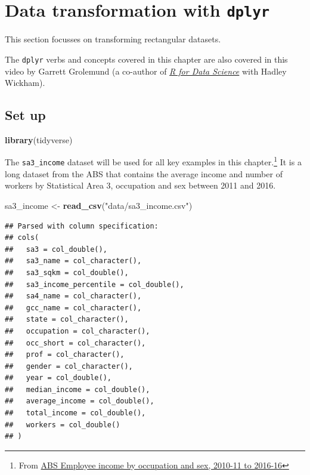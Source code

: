 \documentclass[]{book}
\newenvironment{Shaded}{\begin{snugshade}}{\end{snugshade}}
\newcommand{\KeywordTok}[1]{\textcolor[rgb]{0.13,0.29,0.53}{\textbf{#1}}}
\newcommand{\NormalTok}[1]{#1}
\newcommand{\StringTok}[1]{\textcolor[rgb]{0.31,0.60,0.02}{#1}}
\begin{document}
\hypertarget{data-transformation-with-dplyr}{%
\chapter{\texorpdfstring{Data transformation with \texttt{dplyr}}{Data transformation with dplyr}}\label{data-transformation-with-dplyr}}

This section focusses on transforming rectangular datasets.

The \texttt{dplyr} verbs and concepts covered in this chapter are also covered in this video by Garrett Grolemund (a co-author of \emph{\href{https://r4ds.had.co.nz/}{R for Data Science}} with Hadley Wickham).

\hypertarget{set-up}{%
\section{Set up}\label{set-up}}

\begin{Shaded}
\begin{Highlighting}[]
\KeywordTok{library}\NormalTok{(tidyverse)}
\end{Highlighting}
\end{Shaded}

The \texttt{sa3\_income} dataset will be used for all key examples in this chapter.\footnote{From \href{https://www.abs.gov.au/AUSSTATS/abs@.nsf/DetailsPage/6524.0.55.0022011-2016?OpenDocument}{ABS Employee income by occupation and sex, 2010-11 to 2016-16}} It is a long dataset from the ABS that contains the average income and number of workers by Statistical Area 3, occupation and sex between 2011 and 2016.

\begin{Shaded}
\begin{Highlighting}[]
\NormalTok{sa3_income <-}\StringTok{ }\KeywordTok{read_csv}\NormalTok{(}\StringTok{"data/sa3_income.csv"}\NormalTok{)}
\end{Highlighting}
\end{Shaded}

\begin{verbatim}
## Parsed with column specification:
## cols(
##   sa3 = col_double(),
##   sa3_name = col_character(),
##   sa3_sqkm = col_double(),
##   sa3_income_percentile = col_double(),
##   sa4_name = col_character(),
##   gcc_name = col_character(),
##   state = col_character(),
##   occupation = col_character(),
##   occ_short = col_character(),
##   prof = col_character(),
##   gender = col_character(),
##   year = col_double(),
##   median_income = col_double(),
##   average_income = col_double(),
##   total_income = col_double(),
##   workers = col_double()
## )
\end{verbatim}
\end{document}
